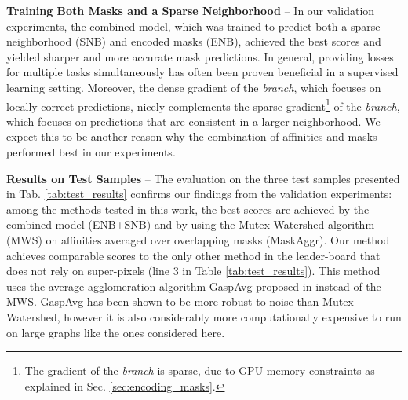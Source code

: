 \textbf{Training Both Masks and a Sparse Neighborhood} -- In our validation experiments, the combined model, which was trained to predict both a sparse neighborhood (SNB) and encoded \maskname masks (ENB), achieved the best scores and yielded sharper and more accurate mask predictions.
In general, providing losses for multiple tasks simultaneously has often been proven beneficial in a supervised learning setting.
Moreover, the dense gradient of the \emph{\encBr branch}, which focuses on locally correct predictions, nicely complements the sparse gradient\footnote{The gradient of the \emph{\encBr branch} is sparse, due to GPU-memory constraints as explained in Sec. \ref{sec:encoding_masks}.} of the \emph{\encBr branch}, which focuses on predictions that are consistent in a larger neighborhood. We expect this to be another reason why the combination of affinities and \maskname masks performed best in our experiments. 





\textbf{Results on Test Samples} -- The evaluation on the three test samples presented in Tab. \ref{tab:test_results} confirms our findings from the validation experiments: among the methods tested in this work, the best scores are achieved by the combined model (ENB+SNB) and by using the Mutex Watershed algorithm (MWS) on affinities averaged over overlapping masks (MaskAggr).
Our method achieves comparable scores to the only other method in the leader-board that does not rely on super-pixels (line 3 in Table \ref{tab:test_results}). This method uses the average agglomeration algorithm GaspAvg proposed in \cite{bailoni2019generalized} instead of the MWS. GaspAvg has been shown to be more robust to noise than Mutex Watershed, however it is also considerably more computationally expensive to run on large graphs like the ones considered here. 

